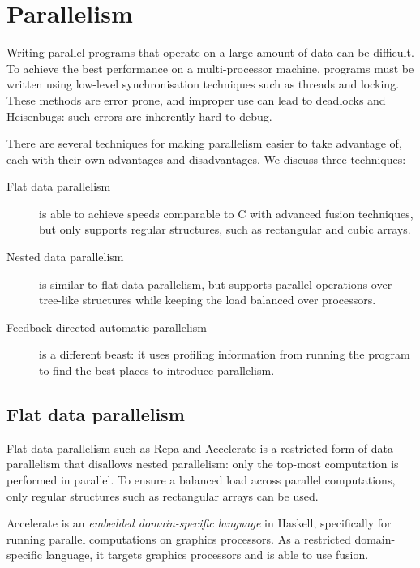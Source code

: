\section{Parallelism}
Writing parallel programs that operate on a large amount of data can be difficult.
To achieve the best performance on a multi-processor machine, programs must be written using low-level synchronisation techniques such as threads and locking.
These methods are error prone, and improper use can lead to deadlocks and Heisenbugs: such errors are inherently hard to debug.

There are several techniques for making parallelism easier to take advantage of,
each with their own advantages and disadvantages.
We discuss three techniques:

\begin{description}
\item[Flat   data parallelism]
is able to achieve speeds comparable to C with advanced fusion techniques,
but only supports regular structures, such as rectangular and cubic arrays.

\item[Nested data parallelism]
is similar to flat data parallelism,
but supports parallel operations over tree-like structures
while keeping the load balanced over processors.

\item[Feedback directed automatic parallelism]
is a different beast: it uses profiling information from running the program
to find the best places to introduce parallelism. 
\end{description}


\subsection{Flat data parallelism}
Flat data parallelism such as Repa\cite{keller2010regular} and Accelerate\cite{mcdonell2013optimising}
is a restricted form of data parallelism that disallows nested parallelism: only the top-most computation is performed in parallel.
To ensure a balanced load across parallel computations, only regular structures such as rectangular arrays can be used.

Accelerate is an \emph{embedded domain-specific language} in Haskell, specifically for running parallel computations on graphics processors.
As a restricted domain-specific language, it targets graphics processors\cite{chakravarty2011accelerating} and is able to use fusion\cite{mcdonell2013optimising}.

